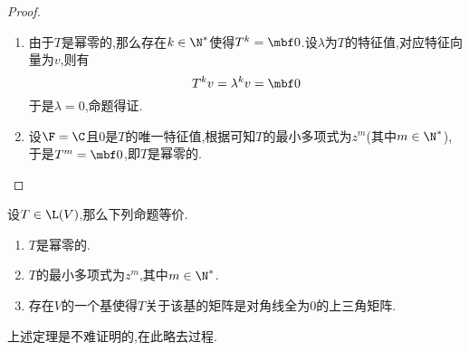 \documentclass{ctexart}
\begin{document}
\begin{proof}
    \begin{enumerate}[label=\tbf{(\arabic*)}]
        \item 由于$T$是幂零的,那么存在$k\in\N^*$使得$T^k=\mbf0$.设$\lambda$为$T$的特征值,对应特征向量为$v$,则有
            \[T^kv=\lambda^k v=\mbf0\]
            于是$\lambda=0$,命题得证.
        \item 设$\F=\C$且$0$是$T$的唯一特征值,根据可知$T$的最小多项式为$z^m$(其中$m\in\N^*$),于是$T^m=\mbf0$,即$T$是幂零的.
    \end{enumerate}
\end{proof}
\begin{formal}[3.4 幂零算子的最小多项式和上三角矩阵]
    设$T\in\L(V)$,那么下列命题等价.
    \begin{enumerate}[label=\tbf{(\alph*)}]
        \item $T$是幂零的.
        \item $T$的最小多项式为$z^m$,其中$m\in\N^*$.
        \item 存在$V$的一个基使得$T$关于该基的矩阵是对角线全为$0$的上三角矩阵.
    \end{enumerate}
\end{formal}\noindent
上述定理是不难证明的,在此略去过程.
\end{document}
